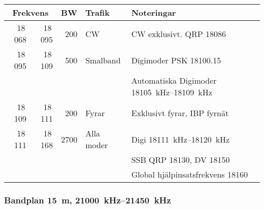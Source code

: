 \begin{tabular}{rrrll}
\multicolumn{2}{c}{\textbf{Frekvens}} & \textbf{BW} & \textbf{Trafik}
        & \textbf{Noteringar} \\ \hline

 18\,068 & 18\,095 & 200  & CW         & CW exklusivt. QRP \num{18086}                             \\ \hline
18\,095  & 18\,109 & 500  & Smalband   & Digimoder PSK \qty{18100,15}{}                             \\
         &         &      &            & Automatiska Digimoder \SIrange{18105}{18109}{\kilo\hertz} \\ \hline
18\,109  & 18\,111 & 200  & Fyrar      & Exklusivt fyrar, IBP fyrnät                               \\ \hline
18\,111  & 18\,168 & 2700 & Alla moder & Digi \SIrange{18111}{18120}{\kilo\hertz}                  \\
         &         &      &            & SSB QRP \num{18130}, DV \num{18150}                       \\
         &         &      &            & Global hjälpinsatsfrekvens \num{18160}                    \\ \hline
\end{tabular}

\subsubsection{Bandplan \qty{15}{\metre}, \SIrange{21000}{21450}{\kilo\hertz}}

